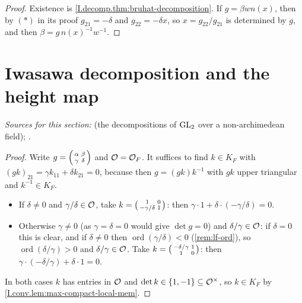 \begin{theorem}
\end{theorem}
\begin{proof}
Existence is \cref{I.decomp.thm:bruhat-decomposition}. If $g=\beta wn(x)$, then by $(*)$ in its proof
$g_{21}=-\delta$ and $g_{22}=-\delta x$, so $x=g_{22}/g_{21}$ is determined by $g$, and then $\beta=g\,n(x)^{-1}w^{-1}$.
\end{proof}

\section{Iwasawa decomposition and the height map}\label{sec:decomp-iwasawa}

\noindent\emph{Sources for this section:} \cite[§9.1]{Cas-p} (the decompositions of $\mathrm{GL}_2$ over a
non-archimedean field); \cite[§2]{JL}.

\begin{theorem}
\end{theorem}
\begin{proof}
Write $g=\begin{psmallmatrix}\alpha&\beta\\\gamma&\delta\end{psmallmatrix}$ and $\mathcal{O}=\mathcal{O}_F$. It suffices to find
$k\in K_F$ with $(gk)_{21}=\gamma k_{11}+\delta k_{21}=0$, because then $g=(gk)k^{-1}$ with $gk$ upper
triangular and $k^{-1}\in K_F$.
\begin{itemize}
\item If $\delta\neq0$ and $\gamma/\delta\in\mathcal{O}$, take $k=\begin{psmallmatrix}1&0\\-\gamma/\delta&1\end{psmallmatrix}$:
  then $\gamma\cdot1+\delta\cdot(-\gamma/\delta)=0$.
\item Otherwise $\gamma\neq0$ (as $\gamma=\delta=0$ would give $\det g=0$) and $\delta/\gamma\in\mathcal{O}$: if $\delta=0$
  this is clear, and if $\delta\neq0$ then $\operatorname{ord}(\gamma/\delta)<0$ (\cref{rem:lf-ord}), so
  $\operatorname{ord}(\delta/\gamma)>0$ and $\delta/\gamma\in\mathcal{O}$. Take
  $k=\begin{psmallmatrix}-\delta/\gamma&1\\1&0\end{psmallmatrix}$: then $\gamma\cdot(-\delta/\gamma)+\delta\cdot1=0$.
\end{itemize}
In both cases $k$ has entries in $\mathcal{O}$ and $\det k\in\{1,-1\}\subseteq\mathcal{O}^\times$, so $k\in K_F$ by
\cref{I.conv.lem:max-compact-local-mem}.
\end{proof}

